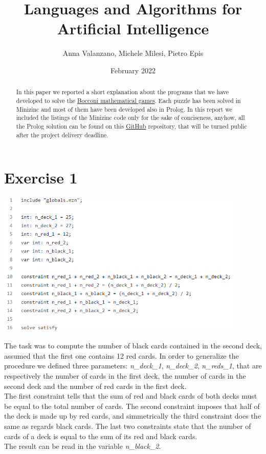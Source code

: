 \documentclass{article}
\title{Languages and Algorithms for Artificial Intelligence}
\date{February 2022}
\author{Anna Valanzano, Michele Milesi, Pietro Epis}
\begin{document}
\maketitle

\begin{abstract}
In this paper we reported a short explanation about the programs that we have developed to solve the \href{https://giochimatematici.unibocconi.it/index.php/gare/giochi-d-autunno/170-gli-allenamenti-ai-giochi-d-autunno}{Bocconi mathematical games}. 
Each puzzle has been solved in Minizinc and most of them have been developed also in Prolog.
In this report we included the listings of the Minizinc code only for the sake of conciseness, anyhow,
all the Prolog solution can be found on this \href{https://github.com/pietroepis/laai-m1-project}{GitHub} repository, that will be turned public after
the project delivery deadline.

\end{abstract}

\section{Exercise 1}
\vspace{0.2cm}
\includegraphics[width=12cm]{img/Es1.png}
\vspace{0.2cm}

The task was to compute the number of black cards contained in the second deck, assumed that
the first one contains 12 red cards. In order to generalize the procedure we defined three parameters:
\textit{n\_deck\_1}, \textit{n\_deck\_2}, \textit{n\_reds\_1}, that are respectively the number of cards in
the first deck, the number of cards in the second deck and the number of red cards in the first deck.\\
The first constraint tells that the sum of red and black cards of both decks must be equal
to the total number of cards. The second constraint imposes that half of the deck is made
up by red cards, and simmetrically the third constraint does the same as regards black cards.
The last two constraints state that the number of cards of a deck is equal to the sum of
its red and black cards.\\
The result can be read in the variable \textit{n\_black\_2}.
\end{document}
